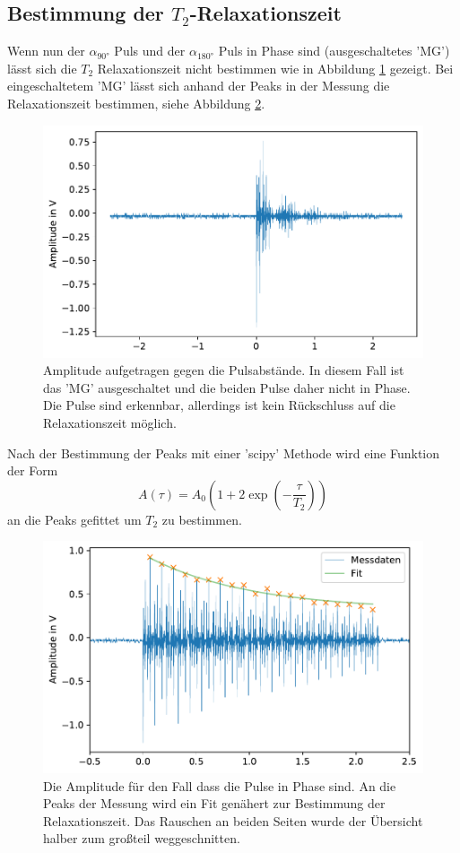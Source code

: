\subsection{Bestimmung der $T_2$-Relaxationszeit}
Wenn nun der $\alpha_{90°}$ Puls und der $\alpha_{180°}$ Puls in Phase sind (ausgeschaltetes 'MG') lässt sich die $T_2$ Relaxationszeit nicht bestimmen wie in Abbildung \ref{fig:df54} gezeigt.
Bei eingeschaltetem 'MG' lässt sich anhand der Peaks in der Messung die Relaxationszeit bestimmen, siehe Abbildung \ref{fig:df52}.
\begin{figure}[H]
    \center
    \includegraphics[scale = 0.75]{plots/df54.pdf}
    \caption{Amplitude aufgetragen gegen die Pulsabstände. In diesem Fall ist das 'MG' ausgeschaltet und die beiden Pulse daher nicht in Phase. Die Pulse sind erkennbar, allerdings ist kein Rückschluss auf die Relaxationszeit möglich.} 
    \label{fig:df54}
\end{figure}
Nach der Bestimmung der Peaks mit einer 'scipy' Methode \cite{2020SciPy-NMeth} wird eine Funktion der Form
\begin{equation*}
    A\left(\tau\right) = A_0 \left(1 + 2\exp\left( - \frac{\tau}{T_2}\right)\right)
\end{equation*}
an die Peaks gefittet um $T_2$ zu bestimmen.
\begin{figure}[ht]
    \center
    \includegraphics[scale = 0.75]{plots/df52.pdf}
    \caption{Die Amplitude für den Fall dass die Pulse in Phase sind. An die Peaks der Messung wird ein Fit genähert zur Bestimmung der Relaxationszeit. Das Rauschen an beiden Seiten wurde der Übersicht halber zum großteil weggeschnitten.}
    \label{fig:df52}
\end{figure}
